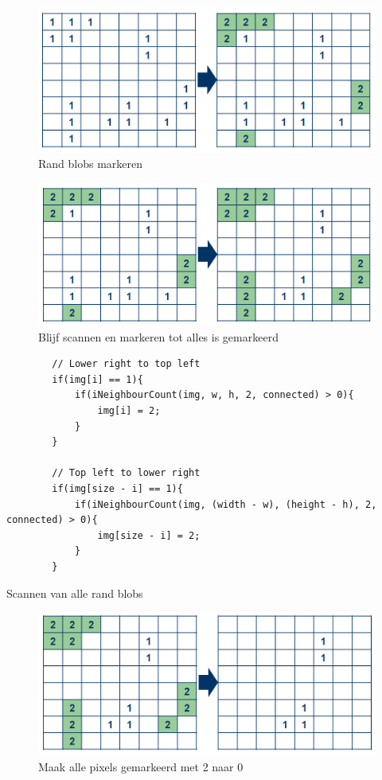 \begin{figure}
    \begin{center}
        \includegraphics[scale=0.35]{figures/border_blob_step1.png}
    \end{center}
    \caption{Rand blobs markeren}
    \label{fig:bbstep1}
\end{figure}

\begin{figure}
    \begin{center}
        \includegraphics[scale=0.35]{figures/border_blob_step2.png}
    \end{center}
    \caption{Blijf scannen en markeren tot alles is gemarkeerd}
    \label{fig:bbstep2}
\end{figure}

\begin{listing}
    \begin{verbatim}
        // Lower right to top left
        if(img[i] == 1){
            if(iNeighbourCount(img, w, h, 2, connected) > 0){
                img[i] = 2;
            }
        }

        // Top left to lower right
        if(img[size - i] == 1){
            if(iNeighbourCount(img, (width - w), (height - h), 2, connected) > 0){
                img[size - i] = 2;
            }
        }
    \end{verbatim}
    \caption{Scannen van alle rand blobs}
    \label{lst:mark-border-neighbours}
\end{listing}

\begin{figure}
    \begin{center}
        \includegraphics[scale=0.35]{figures/border_blob_step3.png}
    \end{center}
    \caption{Maak alle pixels gemarkeerd met 2 naar 0}
    \label{fig:bbstep3}
\end{figure}
